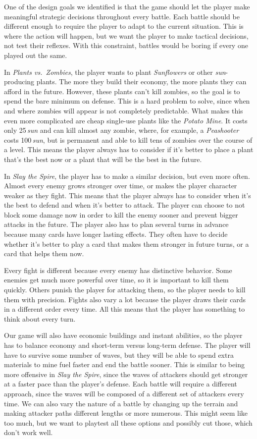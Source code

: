 One of the design goals we identified is that the game should let the player make meaningful strategic decisions throughout every battle.
Each battle should be different enough to require the player to adapt to the current situation.
This is where the action will happen, but we want the player to make tactical decisions, not test their reflexes.
With this constraint, battles would be boring if every one played out the same.

In \emph{Plants vs.\ Zombies}, the player wants to plant \emph{Sunflowers} or other \emph{sun}-producing plants.
The more they build their economy, the more plants they can afford in the future.
However, these plants can't kill zombies, so the goal is to spend the bare minimum on defense.
This is a hard problem to solve, since when and where zombies will appear is not completely predictable.
What makes this even more complicated are cheap single-use plants like the \emph{Potato Mine}.
It costs only 25\,\emph{sun} and can kill almost any zombie, where, for example, a \emph{Peashooter} costs 100\,\emph{sun}, but is permanent and able to kill tens of zombies over the course of a level.
This means the player always has to consider if it's better to place a plant that's the best now or a plant that will be the best in the future.

In \emph{Slay the Spire}, the player has to make a similar decision, but even more often.
Almost every enemy grows stronger over time, or makes the player character weaker as they fight.
This means that the player always has to consider when it's the best to defend and when it's better to attack.
The player can choose to not block some damage now in order to kill the enemy sooner and prevent bigger attacks in the future.
The player also has to plan several turns in advance because many cards have longer lasting effects.
They often have to decide whether it's better to play a card that makes them stronger in future turns, or a card that helps them now.

Every fight is different because every enemy has distinctive behavior.
Some enemies get much more powerful over time, so it is important to kill them quickly.
Others punish the player for attacking them, so the player needs to kill them with precision.
Fights also vary a lot because the player draws their cards in a different order every time.
All this means that the player has something to think about every turn.

Our game will also have economic buildings and instant abilities, so the player has to balance economy and short-term versus long-term defense.
The player will have to survive some number of waves, but they will be able to spend extra materials to mine fuel faster and end the battle sooner.
This is similar to being more offensive in \emph{Slay the Spire}, since the waves of attackers should get stronger at a faster pace than the player's defense.
Each battle will require a different approach, since the waves will be composed of a different set of attackers every time.
We can also vary the nature of a battle by changing up the terrain and making attacker paths different lengths or more numerous.
This might seem like too much, but we want to playtest all these options and possibly cut those, which don't work well.

